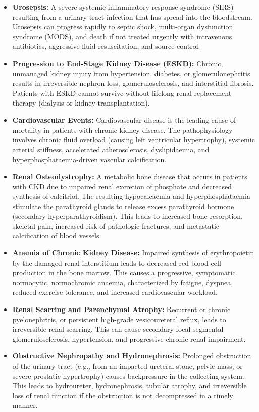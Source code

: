 \begin{itemize}
    \item \textbf{Urosepsis:} A severe systemic inflammatory response syndrome (SIRS) resulting from a urinary tract infection that has spread into the bloodstream. Urosepsis can progress rapidly to septic shock, multi-organ dysfunction syndrome (MODS), and death if not treated urgently with intravenous antibiotics, aggressive fluid resuscitation, and source control.
    \item \textbf{Progression to End-Stage Kidney Disease (ESKD):} Chronic, unmanaged kidney injury from hypertension, diabetes, or glomerulonephritis results in irreversible nephron loss, glomerulosclerosis, and interstitial fibrosis. Patients with ESKD cannot survive without lifelong renal replacement therapy (dialysis or kidney transplantation).
    \item \textbf{Cardiovascular Events:} Cardiovascular disease is the leading cause of mortality in patients with chronic kidney disease. The pathophysiology involves chronic fluid overload (causing left ventricular hypertrophy), systemic arterial stiffness, accelerated atherosclerosis, dyslipidaemia, and hyperphosphataemia-driven vascular calcification.
    \item \textbf{Renal Osteodystrophy:} A metabolic bone disease that occurs in patients with CKD due to impaired renal excretion of phosphate and decreased synthesis of calcitriol. The resulting hypocalcaemia and hyperphosphataemia stimulate the parathyroid glands to release excess parathyroid hormone (secondary hyperparathyroidism). This leads to increased bone resorption, skeletal pain, increased risk of pathologic fractures, and metastatic calcification of blood vessels.
    \item \textbf{Anemia of Chronic Kidney Disease:} Impaired synthesis of erythropoietin by the damaged renal interstitium leads to decreased red blood cell production in the bone marrow. This causes a progressive, symptomatic normocytic, normochromic anaemia, characterized by fatigue, dyspnea, reduced exercise tolerance, and increased cardiovascular workload.
    \item \textbf{Renal Scarring and Parenchymal Atrophy:} Recurrent or chronic pyelonephritis, or persistent high-grade vesicoureteral reflux, leads to irreversible renal scarring. This can cause secondary focal segmental glomerulosclerosis, hypertension, and progressive chronic renal impairment.
    \item \textbf{Obstructive Nephropathy and Hydronephrosis:} Prolonged obstruction of the urinary tract (e.g., from an impacted ureteral stone, pelvic mass, or severe prostatic hypertrophy) causes backpressure in the collecting system. This leads to hydroureter, hydronephrosis, tubular atrophy, and irreversible loss of renal function if the obstruction is not decompressed in a timely manner.
\end{itemize}

